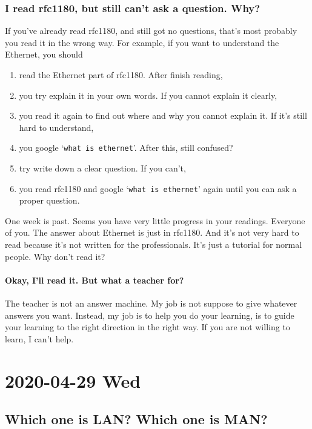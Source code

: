 \documentclass{article}
\begin{document}
\subsubsection{I read rfc1180, but still can't ask a question. Why?}
\label{sec:i-read-it}

If you've already read rfc1180, and still got no questions, that's most probably you read it in
the wrong way. For example, if you want to understand the Ethernet, you should
\begin{enumerate}
\item read the Ethernet part of rfc1180. After finish reading,
\item you try explain it in your own words. If you cannot explain it clearly,
\item you read it again to find out where and why you cannot explain it. If it's still
  hard to understand,
\item you google `\texttt{what is ethernet}'. After this, still confused?
\item try write down a clear question. If you can't,
\item you read rfc1180 and google `\texttt{what is ethernet}' again until you can ask a
  proper question.
\end{enumerate}

One week is past. Seems you have very little progress in your readings. Everyone of you.
The answer about Ethernet is just in rfc1180. And it's not very hard to read because it's
not written for the professionals. It's just a tutorial for normal people. Why don't read
it?

\paragraph{Okay, I'll read it. But what a teacher for?}

The teacher is not an answer machine. My job is not suppose to give whatever answers you
want. Instead, my job is to help you do your learning, is to guide your learning to the
right direction in the right way. If you are not willing to learn, I can't help.

\section{2020-04-29 Wed}
\label{sec:2020-04-29}

\subsection[LAN vs. MAN?]{Which one is LAN? Which one is MAN?}
\label{sec:which-one-lan}
\end{document}
